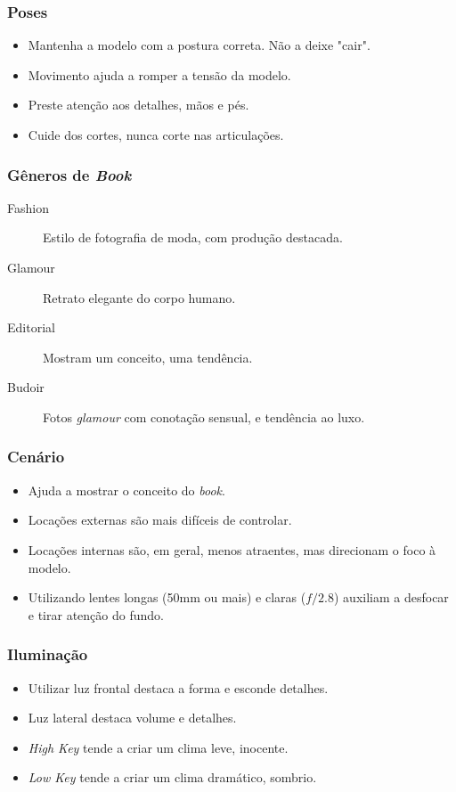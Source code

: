 \begin{frame}
  \frametitle{Poses}
  \begin{itemize}
      \item Mantenha a modelo com a postura correta. Não a deixe "cair".
      \item Movimento ajuda a romper a tensão da modelo.
      \item Preste atenção aos detalhes, mãos e pés.
      \item Cuide dos cortes, nunca corte nas articulações.
  \end{itemize}
\end{frame}

\begin{frame}
  \frametitle{Gêneros de \textit{Book}}
  \begin{description}
      \item[Fashion] Estilo de fotografia de moda, com produção destacada.
      \item[Glamour] Retrato elegante do corpo humano.
      \item[Editorial] Mostram um conceito, uma tendência.
      \item[Budoir] Fotos \textit{glamour} com conotação sensual, e tendência ao luxo.
  \end{description}
\end{frame}

\begin{frame}
  \frametitle{Cenário}
  \begin{itemize}
      \item Ajuda a mostrar o conceito do \textit{book}.
      \item Locações externas são mais difíceis de controlar.
      \item Locações internas são, em geral, menos atraentes, mas direcionam o foco
      à modelo.
      \item Utilizando lentes longas (50mm ou mais) e claras ($f/2.8$) auxiliam a
      desfocar e tirar atenção do fundo.
  \end{itemize}
\end{frame}

\begin{frame}
  \frametitle{Iluminação}
  \begin{itemize}
      \item Utilizar luz frontal destaca a forma e esconde detalhes.
      \item Luz lateral destaca volume e detalhes.
      \item \textit{High Key} tende a criar um clima leve, inocente.
      \item \textit{Low Key} tende a criar um clima dramático, sombrio.
  \end{itemize}
\end{frame}

